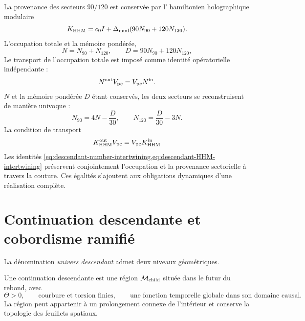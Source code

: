 La provenance des secteurs \(90/120\) est conservée par l'
hamiltonien holographique modulaire
\begin{equation}
 K_{\rm HHM}=c_0I+\Delta_{\rm mod}
 (90N_{90}+120N_{120}).
 \label{eq:descendant-HHM}
\end{equation}
L'occupation totale et la mémoire pondérée,
\begin{equation}
 N=N_{90}+N_{120},
 \qquad
 D=90N_{90}+120N_{120},
 \label{eq:descendant-HHM-data}
\end{equation}
Le transport de l'occupation totale est imposé comme identité opératorielle
indépendante :
\begin{equation}
 N^{\rm out}V_{\rm pc}=V_{\rm pc}N^{\rm in}.
 \label{eq:descendant-number-intertwining}
\end{equation}
\(N\) et la mémoire pondérée \(D\) étant conservés, les deux secteurs se
reconstruisent de manière univoque :
\begin{equation}
 N_{90}=4N-\frac D{30},
 \qquad
 N_{120}=\frac D{30}-3N.
 \label{eq:descendant-HHM-recovery}
\end{equation}
La condition de transport
\begin{equation}
 K_{\rm HHM}^{\rm out}V_{\rm pc}
 =V_{\rm pc}K_{\rm HHM}^{\rm in}
 \label{eq:descendant-HHM-intertwining}
\end{equation}
Les identités
\cref{eq:descendant-number-intertwining,eq:descendant-HHM-intertwining}
préservent conjointement l'occupation et la provenance sectorielle à travers la
couture. Ces égalités s'ajoutent aux obligations dynamiques d'une
réalisation complète.

\section{Continuation descendante et cobordisme ramifié}

La dénomination \emph{univers descendant} admet deux niveaux
géométriques.

\begin{definition}
\label{def:descendant-minimal}
Une continuation descendante est une région
\(\mathcal M_{\rm child}\) située dans le futur du rebond, avec
\begin{equation}
 \Theta>0,
 \qquad
 \text{courbure et torsion finies},
 \qquad
 \text{une fonction temporelle globale dans son domaine causal}.
 \label{eq:descendant-minimal-conditions}
\end{equation}
La région peut appartenir à un prolongement connexe de l'intérieur et
conserve la topologie des feuillets spatiaux.
\end{definition}

